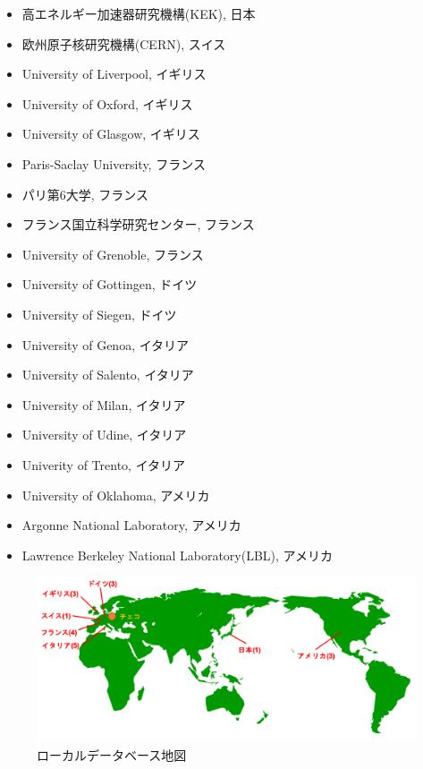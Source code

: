 \begin{itemize}
  \item 高エネルギー加速器研究機構(KEK), 日本
  \item 欧州原子核研究機構(CERN), スイス
  \item University of Liverpool, イギリス
  \item University of Oxford, イギリス
  \item University of Glasgow, イギリス
  \item Paris-Saclay University, フランス
  \item パリ第6大学, フランス
  \item フランス国立科学研究センター, フランス
  \item University of Grenoble, フランス
  \item University of Gottingen, ドイツ
  \item University of Siegen, ドイツ
  \item University of Genoa, イタリア
  \item University of Salento, イタリア
  \item University of Milan, イタリア
  \item University of Udine, イタリア
  \item Univerity of Trento, イタリア
  \item University of Oklahoma, アメリカ
  \item Argonne National Laboratory, アメリカ
  \item Lawrence Berkeley National Laboratory(LBL), アメリカ
\end{itemize}

\begin{figure}[bpt]\centering
\includegraphics[width=14cm]{localdb_world_map}
\caption[ローカルデータベース地図]{ローカルデータベース地図}
\label{localdb_world_map}
\end{figure}

\newpage
